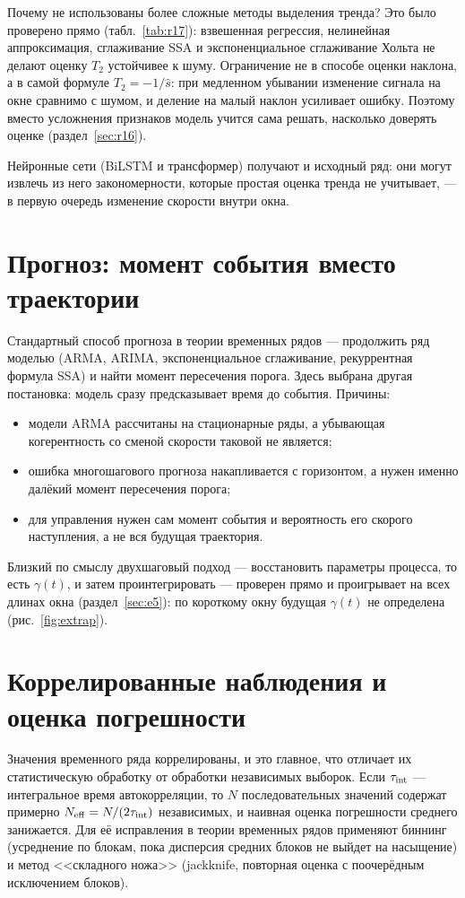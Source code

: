 \documentclass[12pt,a4paper]{report}
\numberwithin{equation}{chapter}
\begin{document}
Почему не использованы более сложные методы выделения тренда? Это было
проверено прямо (табл.~\ref{tab:r17}): взвешенная регрессия, нелинейная
аппроксимация, сглаживание SSA и экспоненциальное сглаживание Хольта не
делают оценку $T_2$ устойчивее к шуму. Ограничение не в способе оценки
наклона, а в самой формуле $T_2=-1/\hat s$: при медленном убывании
изменение сигнала на окне сравнимо с шумом, и деление на малый наклон
усиливает ошибку. Поэтому вместо усложнения признаков модель учится
сама решать, насколько доверять оценке (раздел~\ref{sec:r16}).

Нейронные сети (BiLSTM и трансформер) получают и исходный ряд: они могут
извлечь из него закономерности, которые простая оценка тренда не
учитывает, --- в первую очередь изменение скорости внутри окна.

\section{Прогноз: момент события вместо траектории}

Стандартный способ прогноза в теории временных рядов --- продолжить ряд
моделью (ARMA, ARIMA, экспоненциальное сглаживание, рекуррентная формула
SSA) и найти момент пересечения порога. Здесь выбрана другая постановка:
модель сразу предсказывает время до события. Причины:
\begin{itemize}
\item модели ARMA рассчитаны на стационарные ряды, а убывающая когерентность
      со сменой скорости таковой не является;
\item ошибка многошагового прогноза накапливается с горизонтом, а нужен
      именно далёкий момент пересечения порога;
\item для управления нужен сам момент события и вероятность его скорого
      наступления, а не вся будущая траектория.
\end{itemize}
Близкий по смыслу двухшаговый подход --- восстановить параметры процесса,
то есть $\gamma(t)$, и затем проинтегрировать --- проверен прямо и
проигрывает на всех длинах окна (раздел~\ref{sec:e5}): по короткому окну
будущая $\gamma(t)$ не определена (рис.~\ref{fig:extrap}).

\section{Коррелированные наблюдения и оценка погрешности}
\label{sec:corr}

Значения временного ряда коррелированы, и это главное, что отличает их
статистическую обработку от обработки независимых выборок. Если $\tau_{\rm
int}$ --- интегральное время автокорреляции, то $N$ последовательных
значений содержат примерно $N_{\rm eff}=N/(2\tau_{\rm int})$ независимых, и
наивная оценка погрешности среднего занижается. Для её исправления в теории
временных рядов применяют биннинг (усреднение по блокам, пока дисперсия
средних блоков не выйдет на насыщение) и метод <<складного ножа>>
(jackknife, повторная оценка с поочерёдным исключением блоков).
\end{document}
